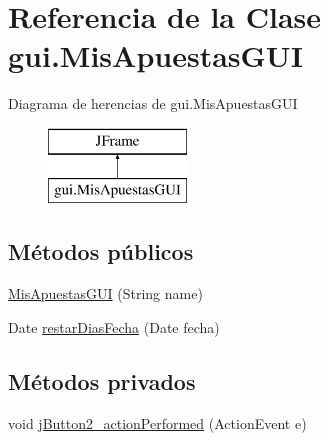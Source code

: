 \hypertarget{classgui_1_1MisApuestasGUI}{}\section{Referencia de la Clase gui.\+Mis\+Apuestas\+G\+UI}
\label{classgui_1_1MisApuestasGUI}
Diagrama de herencias de gui.\+Mis\+Apuestas\+G\+UI\begin{figure}[H]
\begin{center}
\leavevmode
\includegraphics[height=2.000000cm]{classgui_1_1MisApuestasGUI}
\end{center}
\end{figure}
\subsection*{Métodos públicos}
\begin{DoxyCompactItemize}
\item 
\mbox{\hyperlink{classgui_1_1MisApuestasGUI_ae0499aafa67f1c44bb02c39fdfc3c93c}{Mis\+Apuestas\+G\+UI}} (String name)
\item 
Date \mbox{\hyperlink{classgui_1_1MisApuestasGUI_a722e269c10de6d84544743fdccc9941a}{restar\+Dias\+Fecha}} (Date fecha)
\end{DoxyCompactItemize}
\subsection*{Métodos privados}
\begin{DoxyCompactItemize}
\item 
void \mbox{\hyperlink{classgui_1_1MisApuestasGUI_af26ffd2d7cb4a423d0c7c45232e14d33}{j\+Button2\+\_\+action\+Performed}} (Action\+Event e)
\end{DoxyCompactItemize}
